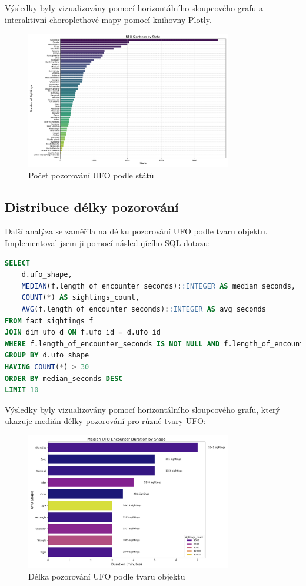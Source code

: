 \documentclass[a4paper,12pt]{article}
\begin{document}
Výsledky byly vizualizovány pomocí horizontálního sloupcového grafu a interaktivní choroplethové mapy pomocí knihovny Plotly.

\begin{figure}[h]
\centering
\includegraphics[width=0.8\textwidth]{../images/ufo_sightings_by_state.png}
\caption{Počet pozorování UFO podle států}
\end{figure}

\subsection{Distribuce délky pozorování}
Další analýza se zaměřila na délku pozorování UFO podle tvaru objektu. Implementoval jsem ji pomocí následujícího SQL dotazu:

\begin{lstlisting}[language=sql, caption=SQL dotaz pro délku pozorování podle tvaru UFO]
SELECT 
    d.ufo_shape,
    MEDIAN(f.length_of_encounter_seconds)::INTEGER AS median_seconds,
    COUNT(*) AS sightings_count,
    AVG(f.length_of_encounter_seconds)::INTEGER AS avg_seconds
FROM fact_sightings f
JOIN dim_ufo d ON f.ufo_id = d.ufo_id
WHERE f.length_of_encounter_seconds IS NOT NULL AND f.length_of_encounter_seconds > 0
GROUP BY d.ufo_shape
HAVING COUNT(*) > 30
ORDER BY median_seconds DESC
LIMIT 10
\end{lstlisting}

Výsledky byly vizualizovány pomocí horizontálního sloupcového grafu, který ukazuje medián délky pozorování pro různé tvary UFO:

\begin{figure}[h]
\centering
\includegraphics[width=0.8\textwidth]{../images/ufo_encounter_duration.png}
\caption{Délka pozorování UFO podle tvaru objektu}
\end{figure}
\end{document}
